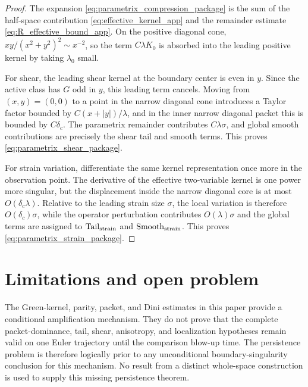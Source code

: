 \documentclass[11pt]{amsart}
\newcommand{\Tail}{\operatorname{Tail}}
\begin{document}
\begin{proof}
The expansion \eqref{eq:parametrix_compression_package} is the sum of the half-space contribution \eqref{eq:effective_kernel_app} and the remainder estimate \eqref{eq:R_effective_bound_app}.  On the positive diagonal cone, \(xy/(x^2+y^2)^2\sim x^{-2}\), so the term \(C\lambda K_0\) is absorbed into the leading positive kernel by taking \(\lambda_0\) small.

For shear, the leading shear kernel at the boundary center is even in \(y\).  Since the active class has \(G\) odd in \(y\), this leading term cancels.  Moving from \((x,y)=(0,0)\) to a point in the narrow diagonal cone introduces a Taylor factor bounded by \(C(x+|y|)/\lambda\), and in the inner narrow diagonal packet this is bounded by \(C\delta_c\).  The parametrix remainder contributes \(C\lambda\sigma\), and global smooth contributions are precisely the shear tail and smooth terms.  This proves \eqref{eq:parametrix_shear_package}.

For strain variation, differentiate the same kernel representation once more in the observation point.  The derivative of the effective two-variable kernel is one power more singular, but the displacement inside the narrow diagonal core is at most \(O(\delta_c\lambda)\).  Relative to the leading strain size \(\sigma\), the local variation is therefore \(O(\delta_c)\sigma\), while the operator perturbation contributes \(O(\lambda)\sigma\) and the global terms are assigned to \(\Tail_{\rm strain}\) and \(\operatorname{Smooth}_{\rm strain}\).  This proves \eqref{eq:parametrix_strain_package}.
\end{proof}

\section{Limitations and open problem}
The Green-kernel, parity, packet, and Dini estimates in this paper provide a conditional amplification mechanism.  They do not prove that the complete packet-dominance, tail, shear, anisotropy, and localization hypotheses remain valid on one Euler trajectory until the comparison blow-up time.  The persistence problem is therefore logically prior to any unconditional boundary-singularity conclusion for this mechanism.  No result from a distinct whole-space construction is used to supply this missing persistence theorem.
\end{document}
